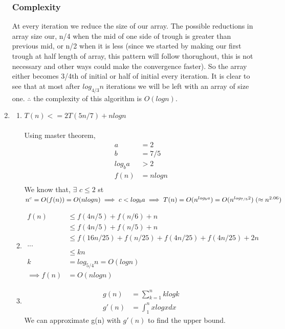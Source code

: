 \documentclass[a4paper,12pt]{report}
\begin{document}
\begin{enumerate}
\subsubsection*{Complexity}
At every iteration we reduce the size of our array. The possible reductions in array size our, n/4 when the mid of one side of trough is greater than previous mid, or n/2 when it is less (since we started by making our first trough at half length of array, this pattern will follow thorughout, this is not necessary and other ways could make the convergence faster). So the array either becomes 3/4th of initial or half of initial every iteration.
It is clear to see that at most after $log_{4/3}n$ iterations we will be left with an array of size one.
$\therefore$ the complexity of this algorithm is $O(logn)$.
\item \begin{enumerate}
\item $T (n) <= 2T (5n/7) + n log n $\\\\
Using master theorem,\\
\begin{align*}
a &= 2\\
b &= 7/5\\
log_ba &> 2\\
f(n) &= nlogn\\
\end{align*}
We know that, $\exists$ $c \leqslant 2$ st $n^c = O(f(n)) = O(nlogn) \implies c < log_ba\\\implies T(n) = O(n^{log_ba}) = O(n^{log_{7/5}2})\;(\approx n^{2.06}) $
\item \begin{align*}
f(n) &\leqslant f(4n/5) + f(n/6) + n\\
&\leqslant f(4n/5) + f(n/5) + n\\
&\leqslant f(16n/25) + f(n/25) + f(4n/25) + f(4n/25) + 2n\\
...\\
&\leqslant kn\\
k &= log_{5/4}n = O(logn)\\
\implies f(n) &= O(nlogn)
\end{align*}
\item
\begin{align*}
g(n) &= \sum_{k=1}^{n} {klogk}\\
g'(n) &= \int_{1}^{n} xlogx dx
\end{align*}
We can approximate g(n) with $g'(n)$ to find the upper bound.
\begin{figure}

\end{figure}
\end{enumerate}
\end{enumerate}
\end{document}
